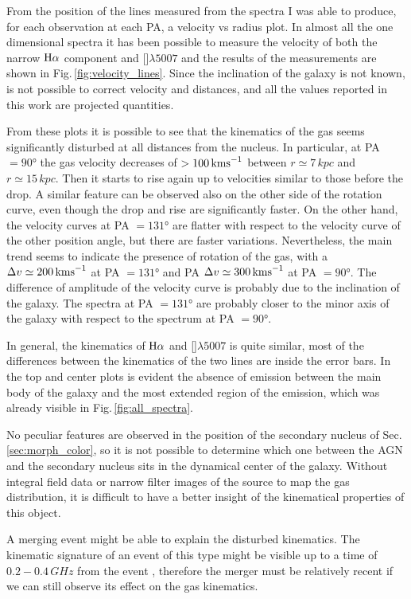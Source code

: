 \documentclass[../thesis.tex]{subfiles}
\begin{document}
From the position of the lines measured from the spectra I was able to produce, for each observation at each PA, a velocity vs radius plot.
In almost all the one dimensional spectra it has been possible to measure the velocity of both the narrow $\Ha$ component and []$\lambda5007$ and the results of the measurements are shown in Fig.\,\ref{fig:velocity_lines}.
Since the inclination of the galaxy is not known, is not possible to correct velocity and distances, and all the values reported in this work are projected quantities.

From these plots it is possible to see that the kinematics of the gas seems significantly disturbed at all distances from the nucleus.
In particular, at PA $=\ang{90}$ the gas velocity decreases of $>100\,\si{\kms}$ between $r\simeq 7\,\si{kpc}$
and $r\simeq 15\,\si{kpc}$.
Then it starts to rise again up to velocities similar to those before the drop.
A similar feature can be observed also on the other side of the rotation curve, even though the drop and rise are significantly faster.
On the other hand, the velocity curves at PA $=\ang{131}$ are flatter with respect to the velocity curve of the other position angle, but there are faster variations.
Nevertheless, the main trend seems to indicate the presence of rotation of the gas, with a $\Delta v \simeq 200\,\si{\kms}$ at PA $=\ang{131}$ and PA $\Delta v \simeq 300\,\si{\kms}$ at PA $=\ang{90}$.
The difference of amplitude of the velocity curve is probably due to the inclination of the galaxy.
The spectra at PA $=\ang{131}$ are probably closer to the minor axis of the galaxy with respect to the spectrum at PA $=\ang{90}$.

In general, the kinematics of $\Ha$ and []$\lambda5007$ is quite similar, most of the differences between the kinematics of the two lines are inside the error bars.
In the top and center plots is evident the absence of emission between the main body of the galaxy and the most extended region of the emission, which was already visible in Fig.\,\ref{fig:all_spectra}.

No peculiar features are observed in the position of the secondary nucleus of Sec.\,\ref{sec:morph_color}, so it is not possible to determine which one between the AGN and the secondary nucleus sits in the dynamical center of the galaxy.
Without integral field data or narrow filter images of the source to map the gas distribution, it is difficult to have a better insight of the kinematical properties of this object.

A merging event might be able to explain the disturbed kinematics.
The kinematic signature of an event of this type might be visible up to a time of $0.2-0.4\,\si{GHz}$ from the event \citep{Hung16}, therefore the merger must be relatively recent if we can still observe its effect on the gas kinematics.
\end{document}
